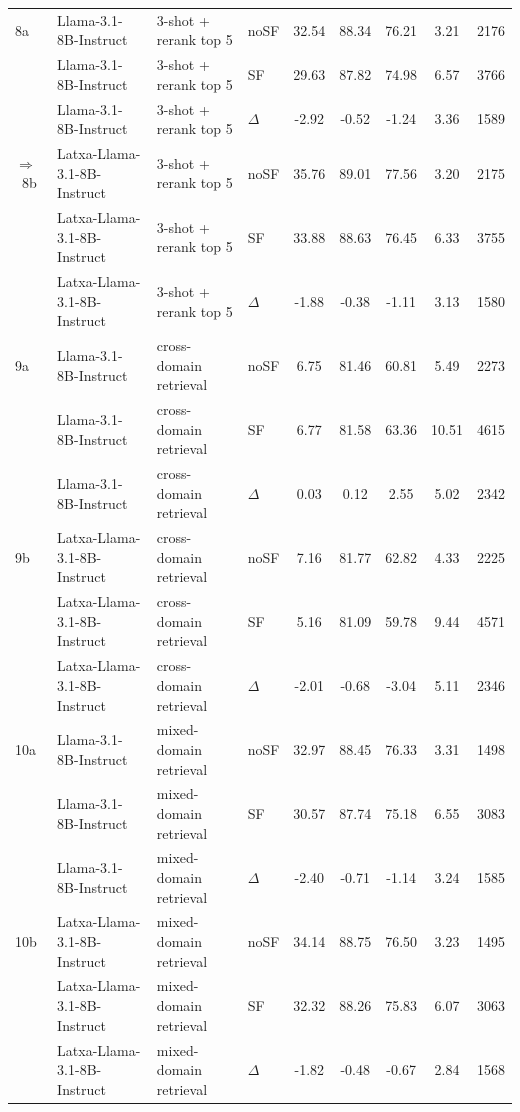 \begin{scriptsize}
\begin{longtable}{l l l l c c c c c}
\dmidrule
8a & Llama-3.1-8B-Instruct & 3-shot + rerank top 5 & noSF & 32.54 & 88.34 & 76.21 & 3.21 & 2176 \\
 & Llama-3.1-8B-Instruct & 3-shot + rerank top 5 & SF & 29.63 & 87.82 & 74.98 & 6.57 & 3766 \\
 & Llama-3.1-8B-Instruct & 3-shot + rerank top 5 & $\Delta$ & -2.92 & -0.52 & -1.24 & 3.36 & 1589 \\
\rowcolor{tabhighlight}$\Rightarrow$~8b & Latxa-Llama-3.1-8B-Instruct & 3-shot + rerank top 5 & noSF & 35.76 & 89.01 & 77.56 & 3.20 & 2175 \\
 & Latxa-Llama-3.1-8B-Instruct & 3-shot + rerank top 5 & SF & 33.88 & 88.63 & 76.45 & 6.33 & 3755 \\
 & Latxa-Llama-3.1-8B-Instruct & 3-shot + rerank top 5 & $\Delta$ & -1.88 & -0.38 & -1.11 & 3.13 & 1580 \\
\dmidrule
9a & Llama-3.1-8B-Instruct & cross-domain retrieval & noSF & 6.75 & 81.46 & 60.81 & 5.49 & 2273 \\
 & Llama-3.1-8B-Instruct & cross-domain retrieval & SF & 6.77 & 81.58 & 63.36 & 10.51 & 4615 \\
 & Llama-3.1-8B-Instruct & cross-domain retrieval & $\Delta$ & 0.03 & 0.12 & 2.55 & 5.02 & 2342 \\
9b & Latxa-Llama-3.1-8B-Instruct & cross-domain retrieval & noSF & 7.16 & 81.77 & 62.82 & 4.33 & 2225 \\
 & Latxa-Llama-3.1-8B-Instruct & cross-domain retrieval & SF & 5.16 & 81.09 & 59.78 & 9.44 & 4571 \\
 & Latxa-Llama-3.1-8B-Instruct & cross-domain retrieval & $\Delta$ & -2.01 & -0.68 & -3.04 & 5.11 & 2346 \\
\dmidrule
10a & Llama-3.1-8B-Instruct & mixed-domain retrieval & noSF & 32.97 & 88.45 & 76.33 & 3.31 & 1498 \\
 & Llama-3.1-8B-Instruct & mixed-domain retrieval & SF & 30.57 & 87.74 & 75.18 & 6.55 & 3083 \\
 & Llama-3.1-8B-Instruct & mixed-domain retrieval & $\Delta$ & -2.40 & -0.71 & -1.14 & 3.24 & 1585 \\
10b & Latxa-Llama-3.1-8B-Instruct & mixed-domain retrieval & noSF & 34.14 & 88.75 & 76.50 & 3.23 & 1495 \\
 & Latxa-Llama-3.1-8B-Instruct & mixed-domain retrieval & SF & 32.32 & 88.26 & 75.83 & 6.07 & 3063 \\
 & Latxa-Llama-3.1-8B-Instruct & mixed-domain retrieval & $\Delta$ & -1.82 & -0.48 & -0.67 & 2.84 & 1568 \\
\end{longtable}
\end{scriptsize}
